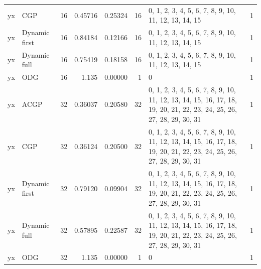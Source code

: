 \documentclass[10pt,a4paper]{article}
\begin{document}
\begin{longtable}{@{}p{23mm}p{29mm}rrrrp{36mm}r@{}}
yx & CGP & 16 & 0.45716 & 0.25324 & 16 & 0, 1, 2, 3, 4, 5, 6, 7, 8, 9, 10, 11, 12, 13, 14, 15 & 1 \\
yx & Dynamic first & 16 & 0.84184 & 0.12166 & 16 & 0, 1, 2, 3, 4, 5, 6, 7, 8, 9, 10, 11, 12, 13, 14, 15 & 1 \\
yx & Dynamic full & 16 & 0.75419 & 0.18158 & 16 & 0, 1, 2, 3, 4, 5, 6, 7, 8, 9, 10, 11, 12, 13, 14, 15 & 1 \\
yx & ODG & 16 & 1.135 & 0.00000 & 1 & 0 & 1 \\
yx & ACGP & 32 & 0.36037 & 0.20580 & 32 & 0, 1, 2, 3, 4, 5, 6, 7, 8, 9, 10, 11, 12, 13, 14, 15, 16, 17, 18, 19, 20, 21, 22, 23, 24, 25, 26, 27, 28, 29, 30, 31 & 1 \\
yx & CGP & 32 & 0.36124 & 0.20500 & 32 & 0, 1, 2, 3, 4, 5, 6, 7, 8, 9, 10, 11, 12, 13, 14, 15, 16, 17, 18, 19, 20, 21, 22, 23, 24, 25, 26, 27, 28, 29, 30, 31 & 1 \\
yx & Dynamic first & 32 & 0.79120 & 0.09904 & 32 & 0, 1, 2, 3, 4, 5, 6, 7, 8, 9, 10, 11, 12, 13, 14, 15, 16, 17, 18, 19, 20, 21, 22, 23, 24, 25, 26, 27, 28, 29, 30, 31 & 1 \\
yx & Dynamic full & 32 & 0.57895 & 0.22587 & 32 & 0, 1, 2, 3, 4, 5, 6, 7, 8, 9, 10, 11, 12, 13, 14, 15, 16, 17, 18, 19, 20, 21, 22, 23, 24, 25, 26, 27, 28, 29, 30, 31 & 1 \\
yx & ODG & 32 & 1.135 & 0.00000 & 1 & 0 & 1 \\
\end{longtable}\normalsize\setlength{\tabcolsep}{6pt}
\clearpage
\end{document}
